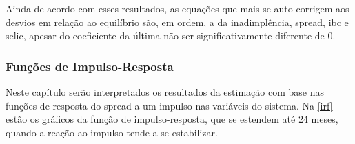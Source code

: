 \documentclass[a4paper,
               article,
               12pt,
               openany,
               oneside,
               english,
               brazil]{abntex2}
\numberwithin{equation}{section}
\begin{document}
    Ainda de acordo com esses resultados, as equações que mais se auto-corrigem aos desvios em relação ao equilíbrio são, em ordem, a da inadimplência, spread, ibc e selic, apesar do coeficiente da última não ser significativamente diferente de 0.

    \subsubsection{Funções de Impulso-Resposta}

    Neste capítulo serão interpretados os resultados da estimação com base nas funções de resposta do spread a um impulso nas variáveis do sistema. Na \autoref{irf} estão os gráficos da função de impulso-resposta, que se estendem até 24 meses, quando a reação ao impulso tende a se estabilizar.
\end{document}
